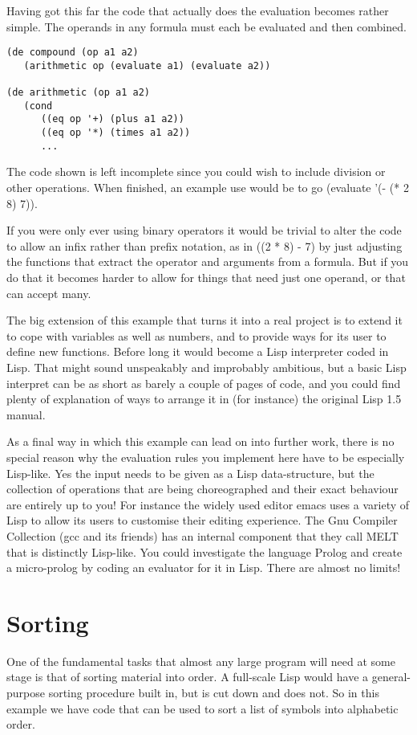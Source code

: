 Having got this far the code that actually does the evaluation becomes
rather simple. The operands in any formula must each be evaluated and then
combined.
{\small\begin{verbatim}
(de compound (op a1 a2)
   (arithmetic op (evaluate a1) (evaluate a2))

(de arithmetic (op a1 a2)
   (cond
      ((eq op '+) (plus a1 a2))
      ((eq op '*) (times a1 a2))
      ...
\end{verbatim}}

The code shown is left incomplete since you could wish to include division
or other operations. When finished, an example use would be to
go {\tx  (evaluate '(- (* 2 8) 7))}.

If you were only ever using binary operators it would be trivial to alter
the code to allow an infix rather than prefix notation, as in
{\tx ((2 * 8) - 7)} by just adjusting the functions that extract
the operator and arguments from a formula. But if you do that it becomes harder
to allow for things that need just one operand, or that can accept many.

The big extension of this example that turns it into a real project is to
extend it to cope with variables as well as numbers, and to provide ways for
its user to define new functions. Before long it would become a Lisp
interpreter coded in Lisp. That might sound unspeakably and improbably
ambitious, but a basic Lisp interpret can be as short as barely a couple of
pages of code, and you could find plenty of explanation of ways to
arrange it in (for instance) the original Lisp 1.5 manual.

As a final way in which this example can lead on into further work, there is
no special reason why the evaluation rules you implement here have to be
especially Lisp-like. Yes the input needs to be given as a Lisp data-structure,
but the collection of operations that are being choreographed and their
exact behaviour are entirely up to you! For instance the widely used editor
{\tx emacs} uses a variety of Lisp to allow its users to customise
their editing experience. The Gnu Compiler Collection ({\tx gcc} and
its friends) has an internal component that they call
{\tx MELT}\cite{gcc-melt} that is distinctly Lisp-like. You could
investigate the language Prolog and create a micro-prolog by coding
an evaluator for it in Lisp. There are almost no limits!

\section{Sorting}
One of the fundamental tasks that almost any large program will need
at some stage is that of sorting material into order. A full-scale Lisp
would have a general-purpose sorting procedure built in, but \vsl{} is
cut down and does not. So in this example we have code that can be used to
sort a list of symbols into alphabetic order.

